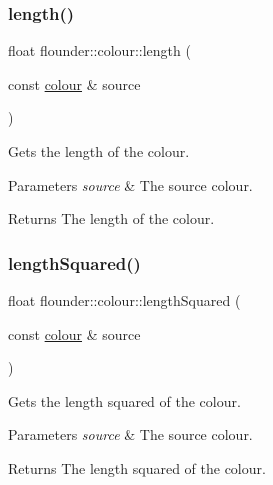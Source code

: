 \subsubsection{\texorpdfstring{length()}{length()}}
{\footnotesize\ttfamily float flounder\+::colour\+::length (\begin{DoxyParamCaption}\item[{const \hyperlink{classflounder_1_1colour}{colour} \&}]{source }\end{DoxyParamCaption})\hspace{0.3cm}{\ttfamily [static]}}



Gets the length of the colour. 


\begin{DoxyParams}{Parameters}
{\em source} & The source colour. \\
\hline
\end{DoxyParams}
\begin{DoxyReturn}{Returns}
The length of the colour. 
\end{DoxyReturn}
\mbox{\label{classflounder_1_1colour_a9eae1aa8bda5bec5c914edfc4f077057}} 
\subsubsection{\texorpdfstring{length\+Squared()}{lengthSquared()}}
{\footnotesize\ttfamily float flounder\+::colour\+::length\+Squared (\begin{DoxyParamCaption}\item[{const \hyperlink{classflounder_1_1colour}{colour} \&}]{source }\end{DoxyParamCaption})\hspace{0.3cm}{\ttfamily [static]}}



Gets the length squared of the colour. 


\begin{DoxyParams}{Parameters}
{\em source} & The source colour. \\
\hline
\end{DoxyParams}
\begin{DoxyReturn}{Returns}
The length squared of the colour. 
\end{DoxyReturn}
\mbox{\label{classflounder_1_1colour_ada2598a03766be3adad831e17dcd822a}} 
